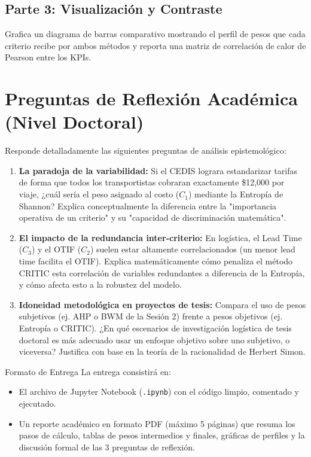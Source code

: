 \documentclass[11pt,a4paper]{article}
\begin{document}
\subsection{Parte 3: Visualización y Contraste}
Grafica un diagrama de barras comparativo mostrando el perfil de pesos que cada criterio recibe por ambos métodos y reporta una matriz de correlación de calor de Pearson entre los KPIs.

\section{Preguntas de Reflexión Académica (Nivel Doctoral)}
Responde detalladamente las siguientes preguntas de análisis epistemológico:
\begin{enumerate}
    \item \textbf{La paradoja de la variabilidad:} Si el CEDIS lograra estandarizar tarifas de forma que todos los transportistas cobraran exactamente \$12,000 por viaje, ¿cuál sería el peso asignado al costo ($C_1$) mediante la Entropía de Shannon? Explica conceptualmente la diferencia entre la "importancia operativa de un criterio" y su "capacidad de discriminación matemática".
    \item \textbf{El impacto de la redundancia inter-criterio:} En logística, el Lead Time ($C_3$) y el OTIF ($C_2$) suelen estar altamente correlacionados (un menor lead time facilita el OTIF). Explica matemáticamente cómo penaliza el método CRITIC esta correlación de variables redundantes a diferencia de la Entropía, y cómo afecta esto a la robustez del modelo.
    \item \textbf{Idoneidad metodológica en proyectos de tesis:} Compara el uso de pesos subjetivos (ej. AHP o BWM de la Sesión 2) frente a pesos objetivos (ej. Entropía o CRITIC). ¿En qué escenarios de investigación logística de tesis doctoral es más adecuado usar un enfoque objetivo sobre uno subjetivo, o viceversa? Justifica con base en la teoría de la racionalidad de Herbert Simon.
\end{enumerate}

\begin{alertbox}{Formato de Entrega}
  La entrega consistirá en:
  \begin{itemize}
      \item El archivo de Jupyter Notebook (\texttt{.ipynb}) con el código limpio, comentado y ejecutado.
      \item Un reporte académico en formato PDF (máximo 5 páginas) que resuma los pasos de cálculo, tablas de pesos intermedios y finales, gráficas de perfiles y la discusión formal de las 3 preguntas de reflexión.
  \end{itemize}
\end{alertbox}
\end{document}
